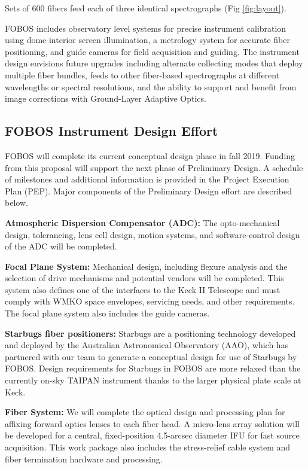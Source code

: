 \documentclass[oneside,11pt]{amsart}
\newcommand{\comment}[2][todo]{{\color{#1}[[{\bf #2}]]}}
\begin{document}
Sets of 600 fibers feed each of three identical spectrographs (Fig
\ref{fig:layout}).  

FOBOS includes observatory level systems for precise instrument
calibration using dome-interior screen illumination, a metrology system
for accurate fiber positioning, and guide cameras for field acquisition
and guiding.  The instrument design envisions future upgrades including
alternate collecting modes that deploy multiple fiber bundles, feeds to
other fiber-based spectrographs at different wavelengths or spectral
resolutions, and the ability to support and benefit from image
corrections with Ground-Layer Adaptive Optics.

\subsection{FOBOS Instrument Design Effort}
\label{sec:design}

FOBOS will complete its current conceptual design phase in fall 2019. Funding from this proposal will support the next
phase of Preliminary Design.  A schedule of milestones and additional information is provided in the Project
Execution Plan (PEP).  Major components of the Preliminary Design effort are described below.

\noindent \textbf{Atmospheric Dispersion Compensator (ADC):} The
opto-mechanical design, tolerancing, lens cell design, motion systems,
and software-control design of the ADC will be completed.  

\noindent \textbf{Focal Plane System:} Mechanical design, including flexure analysis and
the selection of drive mechanisms and potential vendors will be
completed.  This system also defines one of the interfaces to the Keck
II Telescope and must comply with WMKO space envelopes, servicing needs,
and other requirements.  The focal plane system also includes the
guide cameras.

\noindent \textbf{Starbugs fiber positioners:} Starbugs are a
positioning technology developed and deployed by the Australian
Astronomical Observatory (AAO), which has partnered with our team to
generate a conceptual design for use of Starbugs by FOBOS.  Design
requirements for Starbugs in FOBOS are more relaxed than the currently
on-sky TAIPAN instrument thanks to the larger physical plate scale at
Keck.  

\noindent \textbf{Fiber System:} We will complete the optical design and
processing plan for affixing forward optics lenses to each fiber head.  A
micro-lens array solution will be developed for a central,
fixed-position 4.5-arcsec diameter IFU for fast source acquisition. This
work package also includes the stress-relief cable system and fiber
termination hardware and processing.
\end{document}
